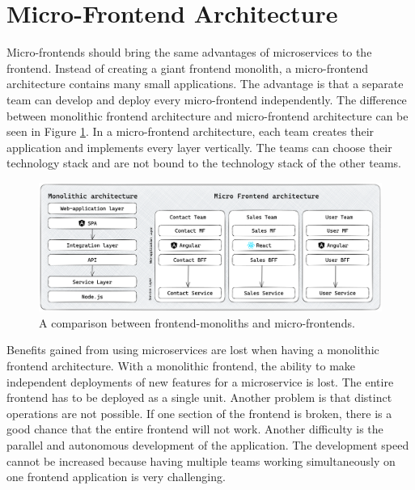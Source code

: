 \section{Micro-Frontend Architecture}\label{section:background:micro-frontend-architecture}

Micro-frontends should bring the same advantages of microservices to the frontend. Instead of creating a giant frontend monolith, a micro-frontend architecture contains many small applications. The advantage is that a separate team can develop and deploy every micro-frontend independently. \cite{book:2020:geers:background:micro-frontends:micro-frontends-in-action} The difference between monolithic frontend architecture and micro-frontend architecture can be seen in Figure \ref{fig:background:micro-frontend:monolith-micro-frontend-comparison}. In a micro-frontend architecture, each team creates their application and implements every layer vertically. The teams can choose their technology stack and are not bound to the technology stack of the other teams.

\ifshowImages
\begin{figure}[H]
  \centering
  \includegraphics[width=1\linewidth]{images/background/micro-frontends/monolith-micro-frontends-comparison.png}
  \caption{A comparison between frontend-monoliths and micro-frontends.}\label{fig:background:micro-frontend:monolith-micro-frontend-comparison}
\end{figure}
\fi

\noindent Benefits gained from using microservices are lost when having a monolithic frontend architecture. With a monolithic frontend, the ability to make independent deployments of new features for a microservice is lost. The entire frontend has to be deployed as a single unit. Another problem is that distinct operations are not possible. If one section of the frontend is broken, there is a good chance that the entire frontend will not work. Another difficulty is the parallel and autonomous development of the application. The development speed cannot be increased because having multiple teams working simultaneously on one frontend application is very challenging. \cite{misc:2019:leitner:background:micro-frontends:micro-frontends-basics}

